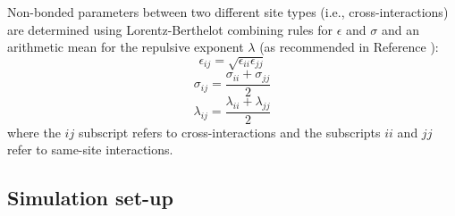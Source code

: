 \documentclass[preprint,review,12pt]{elsarticle}
\begin{document}
	
	Non-bonded parameters between two different site types (i.e., cross-interactions) are determined using Lorentz-Berthelot combining rules \cite{Allen1987} for $\epsilon$ and $\sigma$ and an arithmetic mean for the repulsive exponent $\lambda$ (as recommended in Reference ):
	\begin{equation} \label{eq:Lorentz-Berthelot_eps}
	\epsilon_{ij} = \sqrt{\epsilon_{ii} \epsilon_{jj}}
	\end{equation}
	\begin{equation} \label{eq:Lorentz-Berthelot_sig}
	\sigma_{ij} = \frac{\sigma_{ii} + \sigma_{jj}}{2}
	\end{equation}
	\begin{equation} \label{eq:Lorentz-Berthelot_lam}
	\lambda_{ij} = \frac{\lambda_{ii} + \lambda_{jj}}{2}
	\end{equation}
	where the $ij$ subscript refers to cross-interactions and the subscripts $ii$ and $jj$ refer to same-site interactions. 
	
	
	\subsection{Simulation set-up}
	
\end{document}
